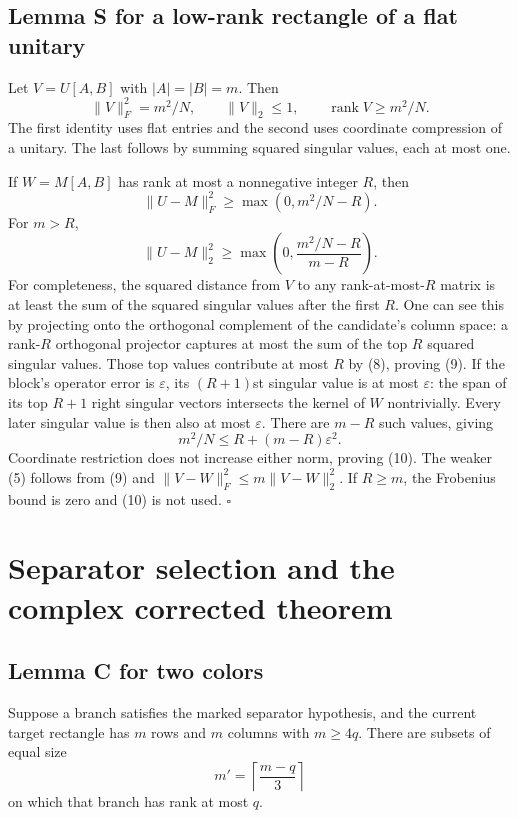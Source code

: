 \documentclass[
  11pt,
]{article}
\begin{document}
\subsection{Lemma S for a low-rank rectangle of a flat
unitary}\label{lemma-s-for-a-low-rank-rectangle-of-a-flat-unitary}

Let \(V=U[A,B]\) with \(|A|=|B|=m\). Then \[
 \|V\|_F^2=m^2/N,\qquad \|V\|_2\le1,\qquad
 \operatorname{rank}V\ge m^2/N.                            \tag{8}
\] The first identity uses flat entries and the second uses coordinate
compression of a unitary. The last follows by summing squared singular
values, each at most one.

If \(W=M[A,B]\) has rank at most a nonnegative integer \(R\), then \[
 \|U-M\|_F^2\ge\max(0,m^2/N-R).                            \tag{9}
\] For \(m>R\), \[
 \|U-M\|_2^2\ge
 \max\left(0,\frac{m^2/N-R}{m-R}\right).                  \tag{10}
\] For completeness, the squared distance from \(V\) to any
rank-at-most-\(R\) matrix is at least the sum of the squared singular
values after the first \(R\). One can see this by projecting onto the
orthogonal complement of the candidate's column space: a rank-\(R\)
orthogonal projector captures at most the sum of the top \(R\) squared
singular values. Those top values contribute at most \(R\) by (8),
proving (9). If the block's operator error is \(\varepsilon\), its
\((R+1)\)st singular value is at most \(\varepsilon\): the span of its
top \(R+1\) right singular vectors intersects the kernel of \(W\)
nontrivially. Every later singular value is then also at most
\(\varepsilon\). There are \(m-R\) such values, giving \[
 m^2/N\le R+(m-R)\varepsilon^2.
\] Coordinate restriction does not increase either norm, proving (10).
The weaker (5) follows from (9) and \(\|V-W\|_F^2\le m\|V-W\|_2^2\). If
\(R\ge m\), the Frobenius bound is zero and (10) is not used.
\(\square\)

\section{Separator selection and the complex corrected
theorem}\label{separator-selection-and-the-complex-corrected-theorem}

\subsection{Lemma C for two colors}\label{lemma-c-for-two-colors}

Suppose a branch satisfies the marked separator hypothesis, and the
current target rectangle has \(m\) rows and \(m\) columns with
\(m\ge4q\). There are subsets of equal size \[
 m'=\left\lceil\frac{m-q}{3}\right\rceil                  \tag{11}
\] on which that branch has rank at most \(q\).
\end{document}
